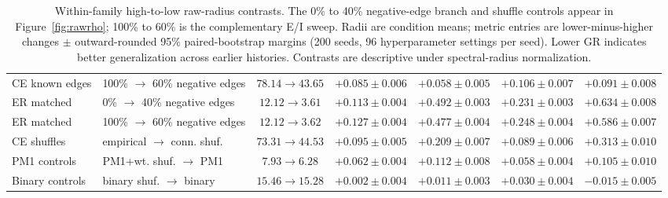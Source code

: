 \begin{table}[tbp]
\begin{tabular}{llccccc}
CE known edges & 100\% $\to$ 60\% negative edges & $78.14\to43.65$ & $+0.085\pm0.006$ & $+0.058\pm0.005$ & $+0.106\pm0.007$ & $+0.091\pm0.008$ \\
ER matched & 0\% $\to$ 40\% negative edges & $12.12\to3.61$ & $+0.113\pm0.004$ & $+0.492\pm0.003$ & $+0.231\pm0.003$ & $+0.634\pm0.008$ \\
ER matched & 100\% $\to$ 60\% negative edges & $12.12\to3.62$ & $+0.127\pm0.004$ & $+0.477\pm0.004$ & $+0.248\pm0.004$ & $+0.586\pm0.007$ \\
CE shuffles & empirical $\to$ conn. shuf. & $73.31\to44.53$ & $+0.095\pm0.005$ & $+0.209\pm0.007$ & $+0.089\pm0.006$ & $+0.313\pm0.010$ \\
PM1 controls & PM1+wt. shuf. $\to$ PM1 & $7.93\to6.28$ & $+0.062\pm0.004$ & $+0.112\pm0.008$ & $+0.058\pm0.004$ & $+0.105\pm0.010$ \\
Binary controls & binary shuf. $\to$ binary & $15.46\to15.28$ & $+0.002\pm0.004$ & $+0.011\pm0.003$ & $+0.030\pm0.004$ & $-0.015\pm0.005$ \\
\hline
\end{tabular}
\caption{Within-family high-to-low raw-radius contrasts. The 0\% to 40\% negative-edge branch and shuffle controls appear in Figure~\ref{fig:rawrho}; 100\% to 60\% is the complementary E/I sweep. Radii are condition means; metric entries are lower-minus-higher changes $\pm$ outward-rounded 95\% paired-bootstrap margins (200 seeds, 96 hyperparameter settings per seed). Lower GR indicates better generalization across earlier histories. Contrasts are descriptive under spectral-radius normalization.}
\label{tab:raw-rho-support}
\end{table}
